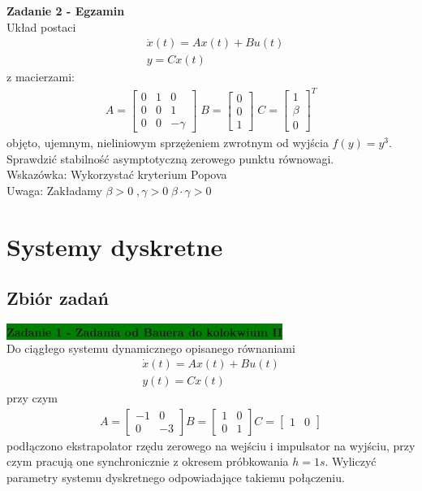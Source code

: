 \documentclass[a4paper,11pt]{article}
\begin{document}
\newpage
\begin{framed}
\textbf{Zadanie 2 - Egzamin } \\ 
Układ postaci
\begin{align*}
&\dot{x}(t)=Ax(t)+Bu(t) \\
&y=Cx(t)
\end{align*}
z macierzami:
\begin{align*}
A = 
\begin{bmatrix}
0 & 1 & 0 \\
0 & 0 & 1 \\
0 & 0 & -\gamma 
\end{bmatrix} 
\;
B = 
\begin{bmatrix}
0 \\
0 \\
1
\end{bmatrix}
\;
C = 
\begin{bmatrix}
1 \\
\beta \\
0
\end{bmatrix}^{T}
\end{align*}
objęto, ujemnym, nieliniowym sprzężeniem zwrotnym od wyjścia \( f(y) = y^3 \). Sprawdzić stabilność asymptotyczną zerowego punktu równowagi. \\
Wskazówka: Wykorzystać kryterium Popova \\
Uwaga: Zakładamy \( \beta > 0 \; , \gamma > 0 \; \beta \cdot \gamma > 0 \)
\end{framed}

\newpage
\section{Systemy dyskretne}

\subsection{Zbiór zadań}
\begin{framed}
\textbf{\colorbox{green}{Zadanie 1 - Zadania od Bauera do kolokwium II} } \\ 
Do ciągłego systemu dynamicznego opisanego równaniami
\begin{align*}
\dot{x}(t)=Ax(t)+Bu(t) \\
y(t)=Cx(t)
\end{align*}
przy czym 
\begin{align*}
A = 
\begin{bmatrix}
-1 & 0 \\
0 & -3
\end{bmatrix}
B = 
\begin{bmatrix}
1 & 0 \\
0 & 1
\end{bmatrix}
C = 
\begin{bmatrix}
1 & 0
\end{bmatrix}
\end{align*}
podłączono ekstrapolator rzędu zerowego na wejściu i impulsator na wyjściu, przy czym pracują one synchronicznie z okresem próbkowania \( h = 1s \). Wyliczyć parametry systemu dyskretnego odpowiadające takiemu połączeniu.
\end{framed}
\end{document}

